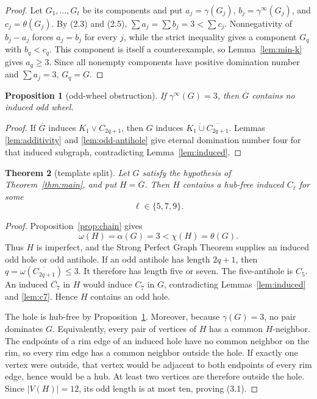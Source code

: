 \documentclass[11pt]{article}
\newtheorem{theorem}{Theorem}[section]
\newtheorem{proposition}[theorem]{Proposition}
\theoremstyle{definition}
\theoremstyle{remark}
\newcommand{\gaminf}{\gamma^{\infty}}
\newcommand{\V}{V}
\begin{document}
\begin{proof}
Let \(G_1,\ldots,G_t\) be its components and put
\(a_j=\gamma(G_j)\), \(b_j=\gaminf(G_j)\), and
\(c_j=\theta(G_j)\).  By (2.3) and (2.5),
\(\sum a_j=\sum b_j=3<\sum c_j\).  Nonnegativity of
\(b_j-a_j\) forces \(a_j=b_j\) for every \(j\), while the strict inequality
gives a component \(G_q\) with \(b_q<c_q\).  This component is itself a
counterexample, so Lemma~\ref{lem:min-k} gives \(a_q\geq3\).  Since all
nonempty components have positive domination number and \(\sum a_j=3\),
\(G_q=G\).
\end{proof}

\begin{proposition}[odd-wheel obstruction]\label{prop:wheel}
If \(\gaminf(G)=3\), then \(\overline G\) contains no induced odd wheel.
\end{proposition}

\begin{proof}
If \(\overline G\) induces \(K_1\vee C_{2q+1}\), then \(G\) induces
\(K_1\mathbin{\dot\cup}\overline{C_{2q+1}}\).  Lemmas
\ref{lem:additivity} and \ref{lem:odd-antihole} give eternal domination
number four for that induced subgraph, contradicting
Lemma~\ref{lem:induced}.
\end{proof}

\begin{theorem}[template split]\label{thm:split}
Let \(G\) satisfy the hypothesis of Theorem~\ref{thm:main}, and put
\(H=\overline G\).  Then \(H\) contains a hub-free induced
\(C_\ell\) for some
\[
  \ell\in\{5,7,9\}.
\tag{3.1}
\]
\end{theorem}

\begin{proof}
Proposition~\ref{prop:chain} gives
\[
  \omega(H)=\alpha(G)=3<\chi(H)=\theta(G).
\tag{3.2}
\]
Thus \(H\) is imperfect, and the Strong Perfect Graph Theorem supplies an
induced odd hole or odd antihole.  If an odd antihole has length \(2q+1\),
then \(q=\omega(\overline{C_{2q+1}})\leq3\).  It therefore has length five
or seven.  The five-antihole is \(C_5\).  An induced
\(\overline{C_7}\) in \(H\) would induce \(C_7\) in \(G\), contradicting
Lemmas~\ref{lem:induced} and \ref{lem:c7}.  Hence \(H\) contains an odd
hole.

The hole is hub-free by Proposition~\ref{prop:wheel}.  Moreover, because
\(\gamma(G)=3\), no pair dominates \(G\).  Equivalently, every pair of
vertices of \(H\) has a common \(H\)-neighbor.  The endpoints of a rim edge
of an induced hole have no common neighbor on the rim, so every rim edge has
a common neighbor outside the hole.  If exactly one vertex were outside,
that vertex would be adjacent to both endpoints of every rim edge, hence
would be a hub.  At least two vertices are therefore outside the hole.
Since \(|\V(H)|=12\), its odd length is at most ten, proving (3.1).
\end{proof}
\end{document}
